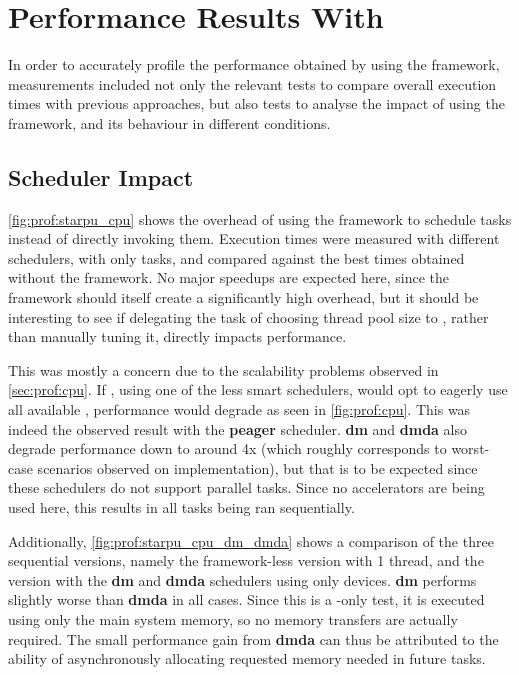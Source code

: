 \documentclass[main.tex]{subfiles}
\begin{document}
\section{Performance Results With \starpu}

In order to accurately profile the performance obtained by using the framework, measurements included not only the relevant tests to compare overall execution times with previous approaches, but also tests to analyse the impact of using the framework, and its behaviour in different conditions.

\subsection{Scheduler Impact}

\cref{fig:prof:starpu_cpu} shows the overhead of using the framework to schedule tasks instead of directly invoking them. Execution times were measured with different schedulers, with only \cpu tasks, and compared against the best \cpu times obtained without the framework. No major speedups are expected here, since the framework should itself create a significantly high overhead, but it should be interesting to see if delegating the task of choosing \openmp thread pool size to \starpu, rather than manually tuning it, directly impacts performance.


This was mostly a concern due to the scalability problems observed in \cref{sec:prof:cpu}. If \starpu, using one of the less smart schedulers, would opt to eagerly use all available \cpus, performance would degrade as seen in \cref{fig:prof:cpu}. This was indeed the observed result with the \textbf{peager} scheduler. \textbf{dm} and \textbf{dmda} also degrade performance down to around 4x (which roughly corresponds to worst-case scenarios observed on \cpu implementation), but that is to be expected since these schedulers do not support parallel tasks. Since no accelerators are being used here, this results in all tasks being ran sequentially.


Additionally, \cref{fig:prof:starpu_cpu_dm_dmda} shows a comparison of the three sequential versions, namely the framework-less \cpu version with 1 thread, and the \starpu version with the \textbf{dm} and \textbf{dmda} schedulers using only \cpu devices. \textbf{dm} performs slightly worse than \textbf{dmda} in all cases. Since this is a \cpu-only test, it is executed using only the main system memory, so no memory transfers are actually required. The small performance gain from \textbf{dmda} can thus be attributed to the ability of asynchronously allocating requested memory needed in future tasks.
\end{document}
